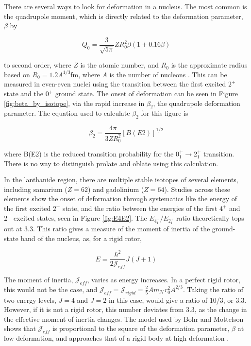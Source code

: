 

There are several ways to look for deformation in a nucleus. The most common is the quadrupole moment, which is directly related to the deformation parameter, $\beta$ by

\begin{equation}
    Q_0 = \frac{3}{\sqrt{5\pi}}ZR_0^2\beta\left(1+0.16\beta\right)
\end{equation}

to second order, where $Z$ is the atomic number, and $R_0$ is the approximate radius based on $R_0=1.2A^{1/3}$fm, where $A$ is the number of nucleons \citep{casten90:_structure}. This can be measured in even-even nuclei using the transition between the first excited $2^+$ state and the $0^+$ ground state. The onset of deformation can be seen in Figure \ref{fig:beta_by_isotope}, via the rapid increase in $\beta_2$, the quadrupole deformation parameter. The equation used to calculate $\beta_2$ for this figure is 

\begin{equation}
    \beta_2 = \frac{4\pi}{3ZR^2_0}\left[B(E2)\right]^{1/2}
\end{equation}

where B(E2) is the reduced transition probability for the $0^+_1\rightarrow2^+_1$ transition. There is no way to distinguish prolate and oblate using this calculation.



In the lanthanide region, there are multiple stable isotopes of several elements, including samarium ($Z=62$) and gadolinium ($Z=64$). Studies across these elements show the onset of deformation through systematics like the energy of the first excited $2^+$ state, and the ratio between the energies of the first $4^+$ and $2^+$ excited states, seen in Figure \ref{fig:E4E2}. The $E_{4^+_1}/E_{2^+_1}$ ratio theoretically tops out at 3.3. This ratio gives a measure of the moment of inertia of the ground-state band of the nucleus, as, for a rigid rotor,

\begin{equation}
    E=\frac{\hbar^2}{2\mathscr{J}_{eff}}J(J+1)
\end{equation}

The moment of inertia, $\mathscr{J}_{eff}$, varies as energy increases. In a perfect rigid rotor, this would not be the case, and $\mathscr{J}_{eff}=\mathscr{J}_{rigid}=\frac{2}{5}Am_{\mathscr{N}}r_0^2A^{2/3}$. Taking the ratio of two energy levels, $J=4$ and $J=2$ in this case, would give a ratio of 10/3, or 3.3. However, if it is not a rigid rotor, this number deviates from 3.3, as the change in the effective moment of inertia changes. The model used by Bohr and Mottelson shows that $\mathscr{J}_{eff}$ is proportional to the square of the deformation parameter, $\beta$ at low deformation, and approaches that of a rigid body at high deformation \citep{bohr55:_deformation}.

